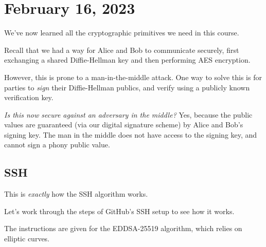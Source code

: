 \section{February 16, 2023}
\label{20230216}

We've now learned all the cryptographic primitives we need in this course.

Recall that we had a way for Alice and Bob to communicate securely, first exchanging a shared Diffie-Hellman key and then performing AES encryption.


However, this is prone to a man-in-the-middle attack. One way to solve this is for parties to \emph{sign} their Diffie-Hellman publics, and verify using a publicly known verification key.


\emph{Is this now secure against an adversary in the middle?} Yes, because the public values are guaranteed (via our digital signature scheme) by Alice and Bob's signing key. The man in the middle does not have access to the signing key, and cannot sign a phony public value.

\subsection{SSH}

This is \emph{exactly} how the SSH algorithm works.


Let's work through the steps of GitHub's SSH setup to see how it works.


The instructions are given for the EDDSA-25519 algorithm, which relies on elliptic curves.

